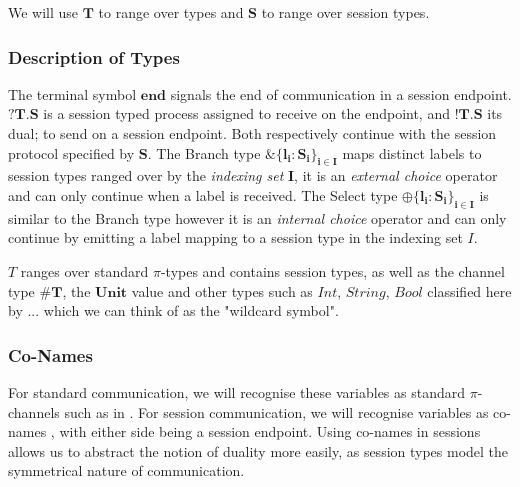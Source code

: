 We will use $\boldsymbol{T}$ to range over types and $\boldsymbol{S}$ to range over session types. 

\subsubsection{Description of Types} The terminal symbol $\boldsymbol{end}$ signals the end of communication in a session endpoint. $\boldsymbol{?T.S}$ is a session typed process assigned to receive on the endpoint, and $\boldsymbol{!T.S}$ its dual; to send on a session endpoint. Both respectively continue with the session protocol specified by $\boldsymbol{S}$. The Branch type $\boldsymbol{\& \{l_i : S_i\}_{i \in I}}$ maps distinct labels to session types ranged over by the \textit{indexing set} $\boldsymbol{I}$, it is an \textit{external choice} operator and can only continue when a label is received. The Select type $\boldsymbol{\oplus \{l_i : S_i\}_{i \in I}}$ is similar to the Branch type however it is an \textit{internal choice} operator and can only continue by emitting a label mapping to a session type in the indexing set $I$.

$T$ ranges over standard $\pi$-types and contains session types, as well as the channel type $\boldsymbol{\#T}$, the $\boldsymbol{Unit}$ value and other types such as $Int$, $String$, $Bool$ classified here by $...$ which we can think of as the "wildcard symbol".


\subsubsection{Co-Names}

For standard communication, we will recognise these variables as standard $\pi$-channels such as in \citep{gay2005subtyping}. For session communication, we will recognise variables as co-names \cite{vasconcelos2012fundamentals}, with either side being a session endpoint. Using co-names in sessions allows us to abstract the notion of duality more easily, as session types model the symmetrical nature of communication. 

